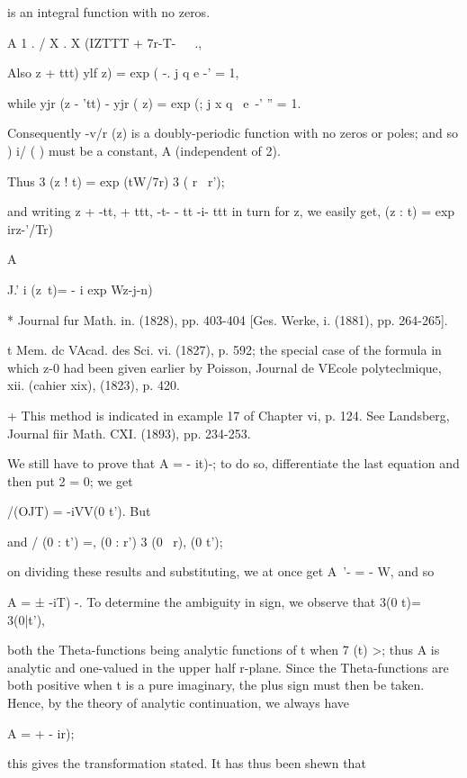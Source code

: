 is an integral function with no zeros.

A 1 . / X . X (IZTTT + 7r-T-\ \ \ .,

Also z + ttt) ylf z) = exp ( -. j q e -' = 1,

while yjr (z - 'tt) - yjr ( z) = exp (; j x q~ e~-' '' = 1.

Consequently -v/r (z) is a doubly-periodic function with no zeros or
poles; and so ) i/ ( ) must be a constant, A (independent of
2).

Thus 3 (z ! t) = exp (tW/7r) 3 ( r \ r');

and writing z + -tt, + ttt, -t- - tt -i- ttt in turn for z, we easily
get, (z : t) = exp irz-'/Tr) %

A%

J.' i (z\ t)= - i exp Wz-j-n) %

* Journal fur Math. in. (1828), pp. 403-404 [Ges. Werke, i. (1881),
pp. 264-265].

t Mem. dc VAcad. des Sci. vi. (1827), p. 592; the special case of the
formula in which z-0 had been given earlier by Poisson, Journal de
VEcole polyteclmique, xii. (cahier xix), (1823), p. 420.

+ This method is indicated in example 17 of Chapter vi, p. 124. See
Landsberg, Journal fiir Math. CXI. (1893), pp. 234-253.

%
%

We still have to prove that A = - it)-; to do so, differentiate the
last equation and then put 2 = 0; we get

 /(OJT) = -iVV(0 t'). But %

and / (0 : t') =, (0 : r') 3 (0 \ r), (0 t');

on dividing these results and substituting, we at once get A~'- = - W,
and so

A = ± -iT) -. To determine the ambiguity in sign, we observe that 3(0
t)= 3(0|t'),

both the Theta-functions being analytic functions of t when 7 (t) >;
thus A is analytic and one-valued in the upper half r-plane. Since the
Theta-functions are both positive when t is a pure imaginary, the plus
sign must then be taken. Hence, by the theory of analytic
continuation, we always have

A = + - ir);

this gives the transformation stated. It has thus been shewn that

